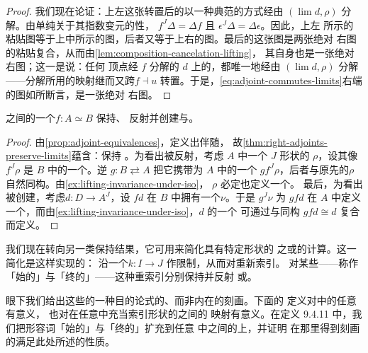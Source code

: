 \begin{proof}
我们现在论证：上左这张转置后的\trCone{}以一种典范的方式经由\trLimit\trCone
$(\lim d,\rho)$ 分解。由单纯\trCotensor{}关于其指数变元的\trTwoFunctor{}性，
$f^{J}\Delta=\Delta f$ 且 $\epsilon^{J}\Delta=\Delta\epsilon$。因此，上左
所示的粘贴图等于上中所示的图，后者又等于上右的图。最后的这张图是两张绝对
右\trLifting{}图的粘贴复合，从而由\cref{lem:composition-cancelation-lifting}，
其自身也是一张绝对右\trLifting{}图；这一\trUniversalProperty{}是说：任何
顶点经 $f$ 分解的 $d$ 上的\trCone，都唯一地经由\trLimit\trCone
$(\lim d,\rho)$ 分解——分解所用的映射继而又跨\trAdjunction $f\dashv u$
转置。于是，\cref{eq:adjoint-commutes-limits}右端的图如所断言，是一张绝对
右\trLifting{}图。
\end{proof}

\begin{proposition}\label{prop:equivalences-limits}
\trInfinityCategory{}之间的一个\trEquivalence $f\colon A\simeq B$ 保持、
反射并创建\trLimit{}与\trColimit。
\end{proposition}

\begin{proof}
由\cref{prop:adjoint-equivalences}，\trEquivalence{}定义出伴随\trFunctor，
故\cref{thm:right-adjoints-preserve-limits}蕴含：\trEquivalence{}保持%
\trLimit。为看出\trLimit{}被反射，考虑 $A$ 中一个 $J$ 形状的\trCone
$\rho$，设其像 $f^{J}\rho$ 是 $B$ 中的一个\trLimit\trCone。逆\trEquivalence
$g\colon B\rightleftarrows A$ 把它携带为 $A$ 中的一个\trLimit\trCone
$gf^{J}\rho$，后者与原先的\trCone $\rho$ 自然同构。由\cref{ex:lifting-invariance-under-iso}，
$\rho$ 必定也定义一个\trLimit\trCone。
最后，为看出\trLimit{}被创建，考虑\trDiagram $d\colon D\to A^J$，设 $fd$
在 $B$ 中拥有一个\trLimit\trCone $\nu$。于是 $g^{J}\nu$ 为\trDiagram
$gfd$ 在 $A$ 中定义一个\trLimit\trCone，而由\cref{ex:lifting-invariance-under-iso}，$d$ 的一个%
\trLimit\trCone{}可通过与同构 $gfd\cong d$ 复合而定义。
\end{proof}

我们现在转向另一类\trLimit{}保持结果，它可用来简化具有特定形状的%
\trDiagram{}之\trLimit{}或\trColimit{}的计算。这一简化是这样实现的：
沿一个\trFunctor $k\colon I\to J$ 作限制，从而对\trDiagram{}重新索引。
对某些\trFunctor——称作「始的」与「终的」——这种重索引分别保持并反射%
\trLimit{}或\trColimit。

眼下我们给出这些\trFunctor{}的一种目的论式的、而非内在的刻画。下面的
定义对\trCartesianClosed{}\trInfinityCosmos{}中的任意\trFunctor{}有意义，
也对在任意\trInfinityCosmos{}中充当索引形状的\trSimplicialSet{}之间的
映射有意义。在定义 9.4.11 中，我们把形容词「始的」与「终的」扩充到任意%
\trInfinityCosmos{}中\trInfinityCategory{}之间的\trFunctor{}上，并证明
在那里得到刻画的\trFunctor{}满足此处所述的性质。

